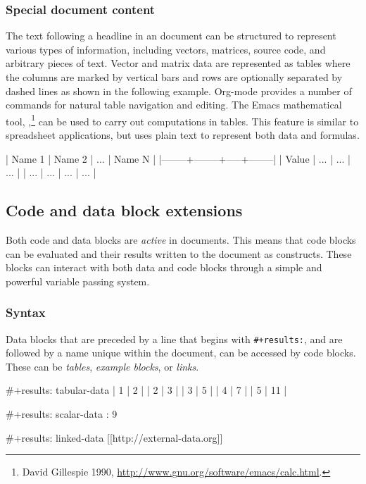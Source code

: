 \documentclass[article,shortnames]{jss}
\begin{document}
\subsubsection{Special document content}
\label{sec-3-1-3}


The text following a headline in an  document can be
structured to represent various types of information, including
vectors, matrices, source code, and arbitrary pieces of text.  Vector
and matrix data are represented as tables where the columns are marked
by vertical bars and rows are optionally separated by dashed lines as
shown in the following example.  Org-mode provides a number of
commands for natural table navigation and editing.  The Emacs
mathematical tool, ,\footnote{David Gillespie 1990,
\href{http://www.gnu.org/software/emacs/calc.html}{http://www.gnu.org/software/emacs/calc.html}. } can be used to carry out
computations in tables.  This feature is similar to spreadsheet
applications, but  uses plain text to represent both data and
formulas.


\begin{Code}
| Name 1 | Name 2 | ... | Name N |
|--------+--------+-----+--------|
| Value  | ...    | ... | ...    |
| ...    | ...    | ... | ...    |
\end{Code}
\subsection{Code and data block extensions}
\label{sec-3-2}
\label{code-blocks}


Both code and data blocks are \emph{active} in  documents.  This
means that code blocks can be evaluated and their results written to
the document as  constructs.  These blocks can interact with
both data and code blocks through a simple and powerful variable
passing system.
\subsubsection{Syntax}
\label{sec-3-2-1}
\label{syntax}


Data blocks that are preceded by a line that begins with \texttt{\#+results:},
and are followed by a name unique within the document, can be accessed
by code blocks. These can be \emph{tables}, \emph{example blocks}, or \emph{links}.

\begin{Code}
#+results: tabular-data
| 1 |  2 |
| 2 |  3 |
| 3 |  5 |
| 4 |  7 |
| 5 | 11 |

#+results: scalar-data
: 9

#+results: linked-data
[[http://external-data.org]]
\end{Code}
\end{document}
